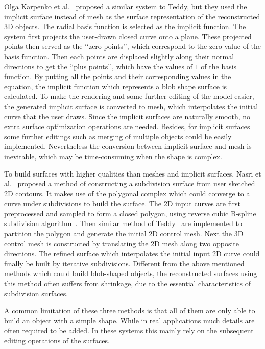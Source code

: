 Olga Karpenko et al.~\cite{KHR02} proposed a similar system to Teddy, but they used the implicit surface instead of mesh as the surface representation of the reconstructed 3D objects. The radial basis function is selected as the implicit function. The system first projects the user-drawn closed curve onto a plane. These projected points then served as the \lq\lq{zero points}\rq\rq, which correspond to the zero value of the basis function. Then each points are displaced slightly along their normal directions to get the \lq\lq {plus points}\rq\rq, which have the values of $1$ of the basis function. By putting all the points and their corresponding values in the equation, the implicit function which represents a blob shape surface is calculated. To make the rendering and some further editing of the model easier, the generated implicit surface is converted to mesh, which interpolates the initial curve that the user draws. Since the implicit surfaces are naturally smooth, no extra surface optimization operations are needed. Besides, for implicit surfaces some further editings such as merging of multiple objects could be easily implemented. Nevertheless the conversion between implicit surface and mesh is inevitable, which may be time-consuming when the shape is complex.

To build surfaces with higher qualities than meshes and implicit surfaces, Nasri et al.~\cite{NKS09} proposed a method of constructing a subdivision surface from user sketched 2D contours. It makes use of the polygonal complex which could converge to a curve under subdivisions to build the surface. The 2D input curves are first preprocessed and sampled to form a closed polygon, using reverse cubic B-spline subdivision algorithm~\cite{BS00}. Then similar method of Teddy~\cite{IMT99} are implemented to partition the polygon and generate the initial 2D control mesh. Next the 3D control mesh is constructed by translating the 2D mesh along two opposite directions. The refined surface which interpolates the initial input 2D curve could finally be built by iterative subdivisions. Different from the above mentioned methods which could build blob-shaped objects, the reconstructed surfaces using this method often suffers from shrinkage, due to the essential characteristics of subdivision surfaces.

A common limitation of these three methods is that all of them are only able to build an object with a simple shape. While in real applications much details are often required to be added. In these systems this mainly rely on the subsequent editing operations of the surfaces.

